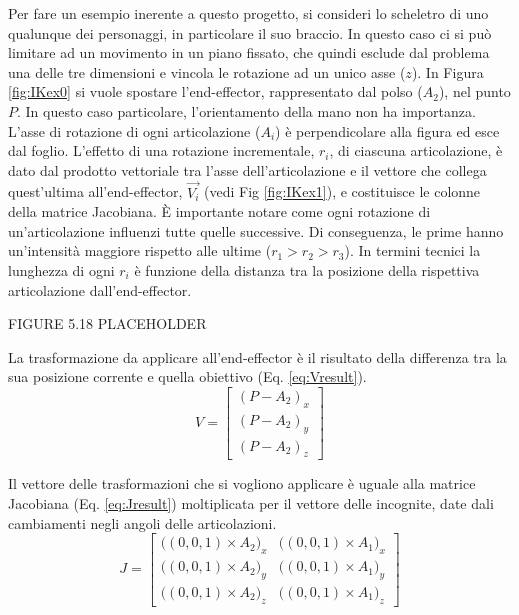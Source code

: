 Per fare un esempio inerente a questo progetto, si consideri lo scheletro di uno qualunque dei personaggi, in particolare il suo braccio.
In questo caso ci si può limitare ad un movimento in un piano fissato, che quindi esclude dal problema una delle tre dimensioni e vincola le rotazione ad un unico asse ($z$).
In Figura \ref{fig:IKex0} si vuole spostare l'end-effector, rappresentato dal polso ($A_2$), nel punto $P$. In questo caso particolare, l'orientamento della mano non ha importanza.
L'asse di rotazione di ogni articolazione ($A_i$) è perpendicolare alla figura ed esce dal foglio.
L'effetto di una rotazione incrementale, $r_i$, di ciascuna articolazione, è dato dal prodotto vettoriale tra l'asse dell'articolazione e il vettore che collega quest'ultima all'end-effector, $\vec{V_i}$ (vedi Fig \ref{fig:IKex1}), e costituisce le colonne della matrice Jacobiana.
È importante notare come ogni rotazione di un'articolazione influenzi tutte quelle successive. Di conseguenza, le prime hanno un'intensità maggiore rispetto alle ultime ($r_1>r_2>r_3$). In termini tecnici la lunghezza di ogni $r_i$ è funzione della distanza tra la posizione della rispettiva articolazione dall'end-effector.

FIGURE 5.18 PLACEHOLDER\label{fig:IKex1}

La trasformazione da applicare all'end-effector è il risultato della differenza tra la sua posizione corrente e quella obiettivo (Eq. \ref{eq:Vresult}).
\begin{equation}\label{eq:Vresult}
    V=
    \begin{bmatrix}
        (P - A_2)_x\\
        (P - A_2)_y\\
        (P - A_2)_z
    \end{bmatrix}
\end{equation}

Il vettore delle trasformazioni che si vogliono applicare è uguale alla matrice Jacobiana (Eq. \ref{eq:Jresult}) moltiplicata per il vettore delle incognite, date dali cambiamenti negli angoli delle articolazioni.
\begin{equation}\label{eq:Jresult}
    J=
    \begin{bmatrix}
        \big((0,0,1) \times A_2\big)_x & \big((0,0,1) \times A_1\big)_x\\
        \big((0,0,1) \times A_2\big)_y & \big((0,0,1) \times A_1\big)_y\\
        \big((0,0,1) \times A_2\big)_z & \big((0,0,1) \times A_1\big)_z
    \end{bmatrix}
\end{equation}

